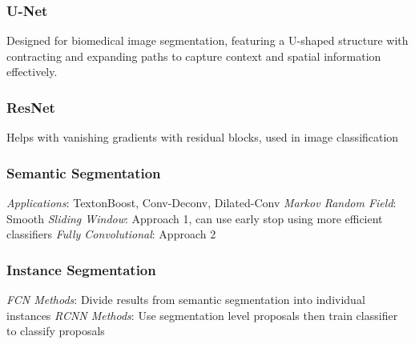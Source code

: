 \documentclass{article}
\begin{document}
\begin{multicols*}{2}
        \subsubsection*{U-Net}
        Designed for biomedical image segmentation, featuring a U-shaped structure with
        contracting and expanding paths to capture context and spatial information effectively.
        \subsubsection*{ResNet}
        Helps with vanishing gradients with residual blocks, used in image classification
        \subsubsection*{Semantic Segmentation}
        \textit{Applications}: TextonBoost, Conv-Deconv, Dilated-Conv\newline
        \textit{Markov Random Field}: Smooth\newline
        \textit{Sliding Window}: Approach 1, can use early stop using more efficient classifiers\newline
        \textit{Fully Convolutional}: Approach 2
        \subsubsection*{Instance Segmentation}
        \textit{FCN Methods}: Divide results from semantic segmentation into individual instances\newline
        \textit{RCNN Methods}: Use segmentation level proposals then train classifier to classify
        proposals
    \end{multicols*}
\end{document}
